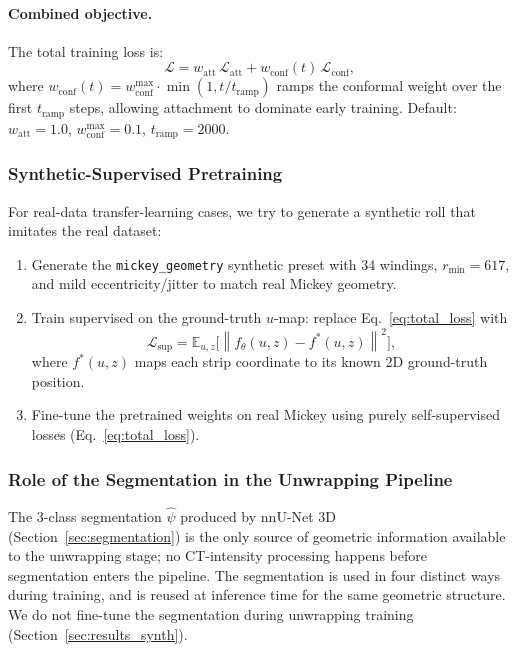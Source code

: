 \documentclass[11pt,a4paper]{article}
\newcommand{\norm}[1]{\left\lVert #1 \right\rVert}
\newcommand{\E}{\mathbb{E}}
\begin{document}
\paragraph{Combined objective.} The total training loss is:
\begin{equation}
    \mathcal{L} = w_{\text{att}}\,\mathcal{L}_{\text{att}} + w_{\text{conf}}(t)\,\mathcal{L}_{\text{conf}},
    \label{eq:total_loss}
\end{equation}
where $w_{\text{conf}}(t) = w_{\text{conf}}^{\max} \cdot \min(1, t / t_{\text{ramp}})$ ramps the conformal weight over the first $t_{\text{ramp}}$ steps, allowing attachment to dominate early training. Default: $w_{\text{att}} = 1.0$, $w_{\text{conf}}^{\max} = 0.1$, $t_{\text{ramp}} = 2000$.

\subsubsection{Synthetic-Supervised Pretraining}

For real-data transfer-learning cases, we try to generate a synthetic roll that imitates the real dataset:

\begin{enumerate}
    \item Generate the \texttt{mickey\_geometry} synthetic preset with 34 windings, $r_{\min} = 617$, and mild eccentricity/jitter to match real Mickey geometry.
    \item Train supervised on the ground-truth $u$-map: replace Eq.~\eqref{eq:total_loss} with
        \begin{equation}
            \mathcal{L}_{\text{sup}} = \E_{u,z}\bigl[\norm{f_\theta(u,z) - f^*(u,z)}^2\bigr],
        \end{equation}
        where $f^*(u,z)$ maps each strip coordinate to its known 2D ground-truth position.
    \item Fine-tune the pretrained weights on real Mickey using purely self-supervised losses (Eq.~\eqref{eq:total_loss}).
\end{enumerate}

\subsubsection{Role of the Segmentation in the Unwrapping Pipeline}
\label{sec:seg_role}

The 3-class segmentation $\hat\psi$ produced by nnU-Net 3D (Section~\ref{sec:segmentation}) is the only source of geometric information available to the unwrapping stage; no CT-intensity processing happens before segmentation enters the pipeline. The segmentation is used in four distinct ways during training, and is reused at inference time for the same geometric structure. We do not fine-tune the segmentation during unwrapping training (Section~\ref{sec:results_synth}).
\end{document}
